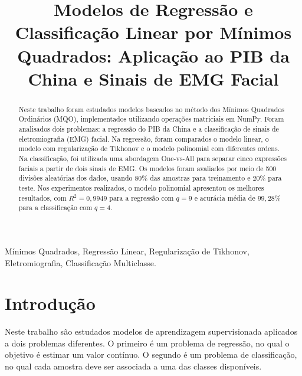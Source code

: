 \documentclass[conference]{IEEEtran}
\begin{document}
\title{Modelos de Regressão e Classificação Linear por Mínimos Quadrados: Aplicação ao PIB da China e Sinais de EMG Facial}

\author{
}

\maketitle

\begin{abstract}
Neste trabalho foram estudados modelos baseados no método dos Mínimos Quadrados Ordinários (MQO), implementados utilizando operações matriciais em NumPy. Foram analisados dois problemas: a regressão do PIB da China e a classificação de sinais de eletromiografia (EMG) facial. Na regressão, foram comparados o modelo linear, o modelo com regularização de Tikhonov e o modelo polinomial com diferentes ordens. Na classificação, foi utilizada uma abordagem One-vs-All para separar cinco expressões faciais a partir de dois sinais de EMG. Os modelos foram avaliados por meio de 500 divisões aleatórias dos dados, usando 80\% das amostras para treinamento e 20\% para teste. Nos experimentos realizados, o modelo polinomial apresentou os melhores resultados, com $R^2 = 0,9949$ para a regressão com $q=9$ e acurácia média de $99,28\%$ para a classificação com $q=4$.
\end{abstract}

\begin{IEEEkeywords}
Mínimos Quadrados, Regressão Linear, Regularização de Tikhonov, Eletromiografia, Classificação Multiclasse.
\end{IEEEkeywords}

\section{Introdução}

Neste trabalho são estudados modelos de aprendizagem supervisionada aplicados a dois problemas diferentes. O primeiro é um problema de regressão, no qual o objetivo é estimar um valor contínuo. O segundo é um problema de classificação, no qual cada amostra deve ser associada a uma das classes disponíveis.
\end{document}

